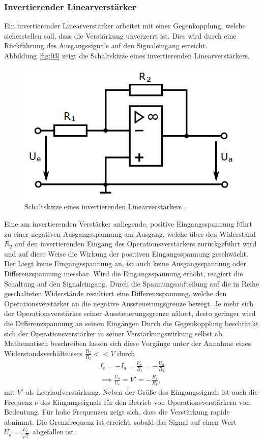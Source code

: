 \subsubsection{Invertierender Linearverstärker}
Ein invertierender Linearverstärker arbeitet mit einer Gegenkopplung, welche
sicherstellen soll, dass die Verstärkung unverzerrt ist. Dies wird durch eine
Rückführung des Ausgangssignals auf den Signaleingang erreicht. \\
Abbildung \autoref{fig:03} zeigt die Schaltskizze eines invertierenden
Linearverstärkers.
\begin{figure}
  \centering
  \includegraphics[scale=0.5]{ressources/figure_03.png}
  \caption{Schaltskizze eines invertierenden Linearverstärkers \cite{sample}.}
  \label{fig:03}
\end{figure}
\noindent Eine am invertierenden Verstärker anliegende, positive Eingangsspannung
führt zu einer negativen Ausgangsspannung am Ausgang, welche über den Widerstand
$R_2$ auf den invertierenden Eingang des Operationsverstärkers zurückgeführt
wird und auf diese Weise die Wirkung der positiven Eingangsspannung geschwächt.
Der Liegt keine Eingangsspannung an, ist auch keine Ausgangsspannung oder
Differenzspannung messbar. Wird die Eingangsspannung erhöht, reagiert die Schaltung
auf den Signaleingang. Durch die Spannungsaufteilung auf die in Reihe
geschalteten Widerstände resultiert eine Differenzspannung, welche den
Operationsverstärker an die negative Aussteuerungsgrenze bewegt. Je mehr sich
der Operationsverstärker seiner Aussteuerungsgrenze nähert, desto geringer wird
die Differenzspannung an seinen Eingängen Durch die Gegenkopplung beschränkt sich
der Operationsverstärker in seiner Verstärkungswirkung selbst ab.
Mathematisch beschreiben lassen sich diese Vorgänge unter der Annahme eines
Widerstandsverhältnisses $\frac{R_2}{R_1} << V$ durch
\begin{align}
  I_e = - I_a = \frac{U_e}{R_1} = - \frac{U_a}{R_2} \\
  \implies \frac{U_a}{U_e} = V' = -\frac{R_2}{R_1},
  \label{eqn:05}
\end{align}
\noindent mit $V'$ als Leerlaufverstärkung. Neben der Größe des Eingangssignals
ist auch die Frequenz $\nu$ des Eingangssignals für den Betrieb von
Operationsverstärkern von Bedeutung. Für hohe Frequenzen zeigt sich, dass die
Verstärkung rapide abnimmt. Die Grenzfrequenz ist erreicht, sobald das
Signal auf einen Wert $U_a = \frac{U_e}{\sqrt{2}}$ abgefallen ist \cite{fredenau, sample}.
